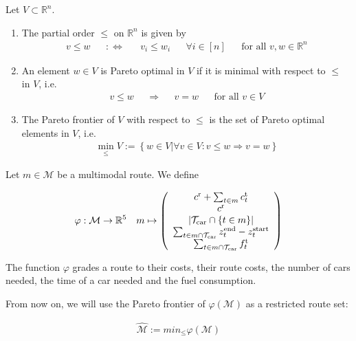 \begin{definition}

Let $V\subset\mathbb{R}^n$.

\begin{enumerate}
	\item{The partial order $\leq$ on $\mathbb{R}^n$ is given by
		\begin{align*}
			v\leq w && :\Leftrightarrow && v_i\leq w_i && \forall i\in[n] && \text{for all }v,w\in\mathbb{R}^n
		\end{align*}}
	\item{An element $w\in V$ is Pareto optimal in $V$ if it is minimal with respect to $\leq$ in $V$, i.e.
		\begin{align*}
			v\leq w && \Rightarrow && v=w && \text{for all } v\in V
		\end{align*}}
	\item{The Pareto frontier of $V$ with respect to $\leq$ is the set of Pareto optimal elements in $V$, i.e.
		\begin{align*}
			\operatorname{min}_{\leq} V := \left\{w\in V|\forall v\in V: v\leq w \Rightarrow v=w\right\}
		\end{align*}}
\end{enumerate}

\end{definition}

Let $m\in\mathcal{M}$ be a multimodal route. We define

\begin{align*}
	\varphi:\mathcal{M}\to\mathbb{R}^5 && m\mapsto\left(
	\begin{array}{c}
		c^{\operatorname{r}} + \sum_{t\in m}c^{\operatorname{t}}_t \\
		c^{\operatorname{r}} \\
		|\mathcal{T}_{\operatorname{car}}\cap\{t\in m\}|\\
		\sum_{t\in m\cap\mathcal{T}_{\operatorname{car}}} z^{\operatorname{end}}_t - z^{\operatorname{start}}_t \\
		\sum_{t\in m\cap\mathcal{T}_{\operatorname{car}}} f^{\operatorname{t}}_t
	\end{array} \right)
\end{align*}

The function $\varphi$ grades a route to their costs, their route costs, the number of cars needed, the time of a car needed and the fuel consumption.

From now on, we will use the Pareto frontier of $\varphi\left(\mathcal{M}\right)$ as a restricted route set:

\begin{align}
	\hat{\mathcal{M}} := min_{\leq} \varphi\left(\mathcal{M}\right)
\end{align}